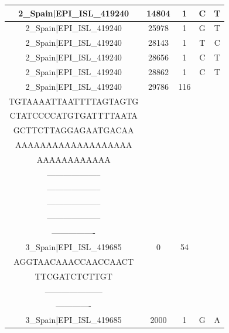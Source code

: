 \documentclass[a4paper,10pt]{article}
\begin{document}
\begin{longtable}{@{}ccccc@{}}
2\_Spain|EPI\_ISL\_419240 & 14804 & 1 & C & T \\* \midrule
2\_Spain|EPI\_ISL\_419240 & 25978 & 1 & G & T \\* \midrule
2\_Spain|EPI\_ISL\_419240 & 28143 & 1 & T & C \\* \midrule
2\_Spain|EPI\_ISL\_419240 & 28656 & 1 & C & T \\* \midrule
2\_Spain|EPI\_ISL\_419240 & 28862 & 1 & C & T \\* \midrule
2\_Spain|EPI\_ISL\_419240 & 29786 & 116 & \begin{tabular}[c]{@{}c@{}}CTATATGGAAGAGCCCTAATG\\ TGTAAAATTAATTTTAGTAGTG\\ CTATCCCCATGTGATTTTAATA\\ GCTTCTTAGGAGAATGACAA\\ AAAAAAAAAAAAAAAAAAA\\ AAAAAAAAAAAA\end{tabular} & \begin{tabular}[c]{@{}c@{}}--------------------\\ --------------------\\ --------------------\\ --------------------\\ --------------------\\ ----------------\end{tabular} \\* \midrule
3\_Spain|EPI\_ISL\_419685 & 0 & 54 & \begin{tabular}[c]{@{}c@{}}ATTAAAGGTTTATACCTTCCC\\ AGGTAACAAACCAACCAACT\\ TTCGATCTCTTGT\end{tabular} & \begin{tabular}[c]{@{}c@{}}--------------------\\ ---------------------\\ -------------\end{tabular} \\* \midrule
3\_Spain|EPI\_ISL\_419685 & 2000 & 1 & G & A \\* \midrule

\end{longtable}
\end{document}
